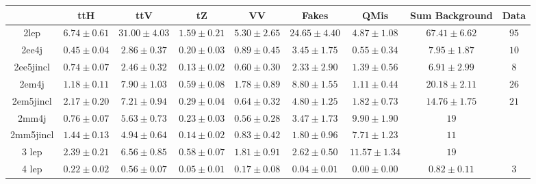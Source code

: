 \begin{tabular}{|c|c|c|c|c|c|c|c|c|}
\hline
                & ttH              & ttV                & tZ               & VV                     & Fakes           & QMis            & Sum Background         & Data   \\
\hline
2lep     &  $6.74 \pm 0.61$ &   $31.00 \pm 4.03$ &  $1.59 \pm 0.21$ &        $5.30 \pm 2.65$ & $24.65 \pm 4.40$ & $4.87 \pm 1.08$ &       $67.41 \pm 6.62$ &    $95$\\
2ee4j     &  $0.45 \pm 0.04$ &    $2.86 \pm 0.37$ &  $0.20 \pm 0.03$ &        $0.89 \pm 0.45$ & $3.45 \pm 1.75$ & $0.55 \pm 0.34$ &        $7.95 \pm 1.87$ &    $10$\\
2ee5jincl     &  $0.74 \pm 0.07$ &    $2.46 \pm 0.32$ &  $0.13 \pm 0.02$ &        $0.60 \pm 0.30$ & $2.33 \pm 2.90$ & $1.39 \pm 0.56$ &        $6.91 \pm 2.99$ &     $8$\\
2em4j     &  $1.18 \pm 0.11$ &    $7.90 \pm 1.03$ &  $0.59 \pm 0.08$ &        $1.78 \pm 0.89$ & $8.80 \pm 1.55$ & $1.11 \pm 0.44$ &       $20.18 \pm 2.11$ &    $26$\\
2em5jincl     &  $2.17 \pm 0.20$ &    $7.21 \pm 0.94$ &  $0.29 \pm 0.04$ &        $0.64 \pm 0.32$ & $4.80 \pm 1.25$ & $1.82 \pm 0.73$ &       $14.76 \pm 1.75$ &    $21$\\
2mm4j     &  $0.76 \pm 0.07$ &    $5.63 \pm 0.73$ &  $0.23 \pm 0.03$ &        $0.56 \pm 0.28$ & $3.47 \pm 1.73$ &        $9.90 \pm 1.90$ &    $19$\\
2mm5jincl     &  $1.44 \pm 0.13$ &    $4.94 \pm 0.64$ &  $0.14 \pm 0.02$ &        $0.83 \pm 0.42$ & $1.80 \pm 0.96$ &        $7.71 \pm 1.23$ &    $11$\\
3 lep    &  $2.39 \pm 0.21$ &    $6.56 \pm 0.85$ &  $0.58 \pm 0.07$ &        $1.81 \pm 0.91$ & $2.62 \pm 0.50$ &       $11.57 \pm 1.34$ &    $19$\\
4 lep     &  $0.22 \pm 0.02$ &    $0.56 \pm 0.07$ &  $0.05 \pm 0.01$ &        $0.17 \pm 0.08$ &      $0.04 \pm 0.01$ &           $0.00 \pm 0.00$ &           $0.82 \pm 0.11$ &     $3$\\
\hline
\end{tabular}

